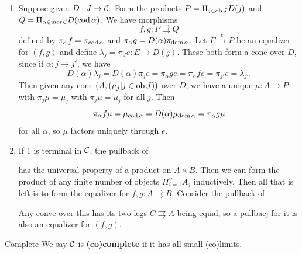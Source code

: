 \documentclass{article}
\begin{document}
\proof \hspace{0.1cm}\begin{enumerate}
    \item[(i) \& (ii)] Suppose given $D: J \to \mathcal{C}$. Form the products $P = \Pi_{j \in \operatorname{ob} J} D(j)$ and $Q = \Pi_{\alpha \in \operatorname{mor} \mathcal{C}} D(\operatorname{cod} \alpha)$. We have morphisms \[ f,g : P \rightrightarrows Q\] defined by $\pi_{\alpha}f = \pi_{\operatorname{cod} \alpha}$ and $\pi_{\alpha}g=D(\alpha) \pi_{\operatorname{dom} \alpha}.$ Let $E \xrightarrow{e} P$ be an equalizer for $(f,g)$ and define $\lambda_{j} = \pi_{J}e : E \to D(j)$. 
    \gap These both form a cone over $D$, since if  $\alpha : j \to j'$, we have \[D(\alpha)\lambda_{j} = D(\alpha)\pi_{j}e = \pi_{\alpha}ge = \pi_{\alpha}fe = \pi_{j'}e = \lambda_{j'}.\] Then given any cone $(A, (\mu_{j} | j \in \operatorname{ob} J))$ over $D$, we have a unique $\mu : A \to P$ with $\pi_{j} \mu = \mu_{j}$ with $\pi_{j}\mu = \mu_{j}$ for all $j$. Then \[ \pi_{\alpha}f\mu = \mu_{\operatorname{cod} \alpha} = D(\alpha) \mu_{\operatorname{dom} \alpha} = \pi_{\alpha} g \mu\] for all $\alpha$, so $\mu$ factors uniquely through $e$.
    \item[(iii) $\Rightarrow$ (ii)] If $1$ is terminal in $\mathcal{C}$, the pullback of \begin{center}
    \end{center}
    has the universal property of a product on $A\times B$. Then we can form the product of any finite number of objects $\Pi_{i = 1}^{n} A_{j}$ inductively. Then all that is left is to form the equalizer for $f, g : A \rightrightarrows B$. Consider the pullback of \begin{center}
    \end{center}
    Any conve over this has its two legs $C \rightrightarrows A$ being equal, so a pullbacj for it is also an equalizer for $(f,g)$.
\end{enumerate}
\endproof
\begin{fancydefine*}{Complete}
    We say $\mathcal{C}$ is \textbf{(co)complete} if it has all small (co)limits.
\end{fancydefine*}
\end{document}
